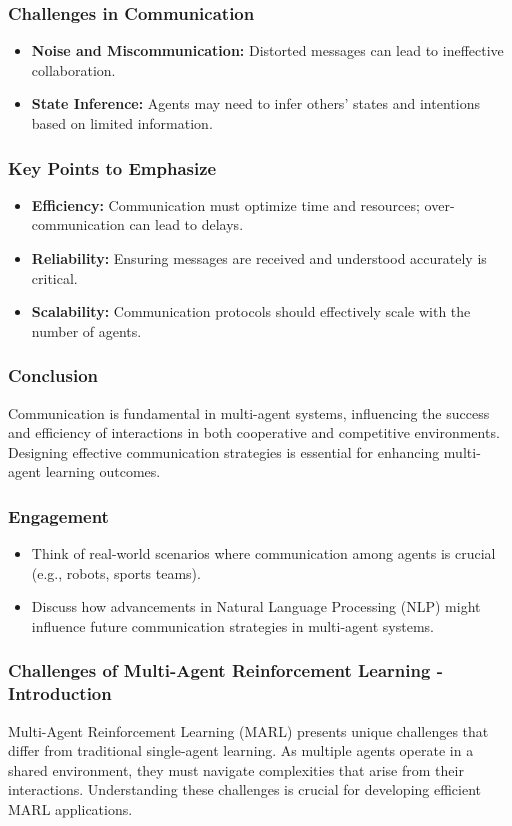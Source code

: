 \documentclass[aspectratio=169]{beamer}
\begin{document}
\begin{frame}[fragile]
  \frametitle{Challenges in Communication}
  \begin{itemize}
    \item \textbf{Noise and Miscommunication:} Distorted messages can lead to ineffective collaboration.
    \item \textbf{State Inference:} Agents may need to infer others' states and intentions based on limited information.
  \end{itemize}
\end{frame}

\begin{frame}[fragile]
  \frametitle{Key Points to Emphasize}
  \begin{itemize}
    \item \textbf{Efficiency:} Communication must optimize time and resources; over-communication can lead to delays.
    \item \textbf{Reliability:} Ensuring messages are received and understood accurately is critical.
    \item \textbf{Scalability:} Communication protocols should effectively scale with the number of agents.
  \end{itemize}
\end{frame}

\begin{frame}[fragile]
  \frametitle{Conclusion}
  Communication is fundamental in multi-agent systems, influencing the success and efficiency of interactions in both cooperative and competitive environments. Designing effective communication strategies is essential for enhancing multi-agent learning outcomes.
\end{frame}

\begin{frame}[fragile]
  \frametitle{Engagement}
  \begin{itemize}
    \item Think of real-world scenarios where communication among agents is crucial (e.g., robots, sports teams).
    \item Discuss how advancements in Natural Language Processing (NLP) might influence future communication strategies in multi-agent systems.
  \end{itemize}
\end{frame}

\begin{frame}[fragile]
    \frametitle{Challenges of Multi-Agent Reinforcement Learning - Introduction}
    Multi-Agent Reinforcement Learning (MARL) presents unique challenges that differ from traditional single-agent learning. As multiple agents operate in a shared environment, they must navigate complexities that arise from their interactions. Understanding these challenges is crucial for developing efficient MARL applications.
\end{frame}
\end{document}
